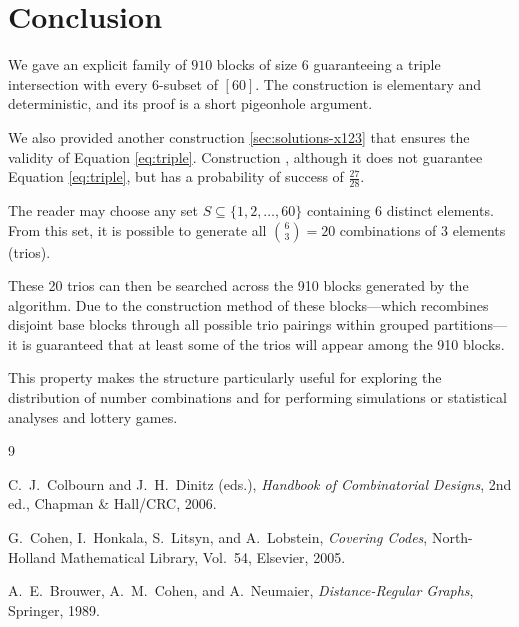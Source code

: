 \documentclass[11pt]{article}
\begin{document}
\section{Conclusion}

We gave an explicit family of $910$ blocks of size $6$ guaranteeing a triple intersection with every
$6$-subset of $[60]$.
The construction is elementary and deterministic, and its proof is a short pigeonhole argument.

 We also provided another construction \ref{sec:solutions-x123} that ensures the validity of Equation \ref{eq:triple}. Construction , although it does not guarantee Equation \ref{eq:triple}, but has a probability of success of $\frac{27}{28}.$



The reader may choose any set \( S \subseteq \{1, 2, \dots, 60\} \) containing 6 distinct elements.  
From this set, it is possible to generate all \( \binom{6}{3} = 20 \) combinations of 3 elements (trios).

These 20 trios can then be searched across the 910 blocks generated by the algorithm.  
Due to the construction method of these blocks—which recombines disjoint base blocks through all possible trio pairings within grouped partitions—it is guaranteed that at least some of the trios will appear among the 910 blocks.

This property makes the structure particularly useful for exploring the distribution of number combinations and for performing simulations or statistical analyses and lottery games.



 
\begin{thebibliography}{9}

C.\ J.\ Colbourn and J.\ H.\ Dinitz (eds.),
\emph{Handbook of Combinatorial Designs}, 2nd ed.,
Chapman \& Hall/CRC, 2006.

G.\ Cohen, I.\ Honkala, S.\ Litsyn, and A.\ Lobstein,
\emph{Covering Codes},
North-Holland Mathematical Library, Vol.\ 54, Elsevier, 2005.

A.\ E.\ Brouwer, A.\ M.\ Cohen, and A.\ Neumaier,
\emph{Distance-Regular Graphs},
Springer, 1989.

\end{thebibliography}
\end{document}
